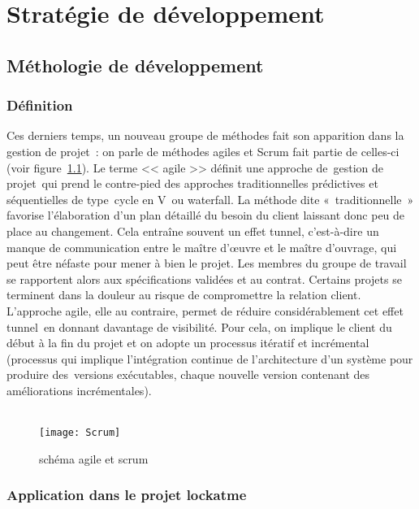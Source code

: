 \chapter{Stratégie de développement}
\section{Méthologie de développement}
\subsection{Définition}

Ces derniers temps, un nouveau groupe de méthodes fait son apparition dans la
gestion de projet : on parle de méthodes agiles et Scrum fait partie de
celles-ci (voir figure~\ref{fig:scrum}). Le terme << agile >> définit une approche de gestion
de projet qui prend le contre-pied des approches traditionnelles prédictives et
séquentielles de type cycle en V ou waterfall.
La méthode dite « traditionnelle » favorise l’élaboration d’un plan détaillé
du besoin du client laissant donc peu de place au changement. Cela entraîne
souvent un effet tunnel, c’est-à-dire un manque de communication entre le
maître d’œuvre et le maître d’ouvrage, qui peut être néfaste pour mener à bien
le projet. Les membres du groupe de travail se rapportent alors aux
spécifications validées et au contrat. Certains projets se terminent dans la
douleur au risque de compromettre la relation client.
L’approche agile, elle au contraire, permet de réduire considérablement cet
effet tunnel en donnant davantage de visibilité. Pour cela, on implique le
client du début à la fin du projet et on adopte un processus itératif et
incrémental (processus qui implique l'intégration continue de l'architecture
d'un système pour produire des versions exécutables, chaque nouvelle version
contenant des améliorations incrémentales).
\\
\\

\begin{figure}[h]\label{fig:scrum}
  \texttt{[image: Scrum]}
  \caption{schéma agile et scrum}
\end{figure}

\subsection{Application dans le projet lockatme}

